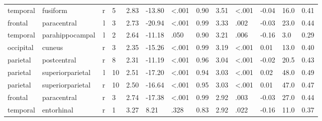 \documentclass{article}
\begin{document}
\begin{longtable}{llrR{1.5cm}R{1cm}R{1.3cm}R{1cm}R{1cm}R{1.3cm}R{1cm}R{1.8cm}R{1.3cm}R{1.8cm}}
  temporal &                  fusiform &    r &            5 &                  2.83 &           -13.80 &      \textless.001 &                               0.90 &                          3.51 &                   \textless.001 & -0.04 &   16.0 &      0.41 \\
   frontal &               paracentral &    l &            3 &                  2.73 &           -20.94 &      \textless.001 &                               0.99 &                          3.33 &                            .002 & -0.03 &   23.0 &      0.44 \\
  temporal &           parahippocampal &    l &            2 &                  2.64 &           -11.18 &               .050 &                               0.90 &                          3.21 &                            .006 & -0.16 &    3.0 &      0.29 \\
 occipital &                    cuneus &    r &            3 &                  2.35 &           -15.26 &      \textless.001 &                               0.99 &                          3.19 &                   \textless.001 &  0.01 &   13.0 &      0.40 \\
  parietal &               postcentral &    r &            8 &                  2.31 &           -11.19 &      \textless.001 &                               0.96 &                          3.04 &                   \textless.001 & -0.02 &   20.5 &      0.43 \\
  parietal &          superiorparietal &    l &           10 &                  2.51 &           -17.20 &      \textless.001 &                               0.94 &                          3.03 &                   \textless.001 &  0.02 &   48.0 &      0.49 \\
  parietal &          superiorparietal &    r &           10 &                  2.50 &           -16.64 &      \textless.001 &                               0.95 &                          3.03 &                   \textless.001 &  0.01 &   47.0 &      0.47 \\
   frontal &               paracentral &    r &            3 &                  2.74 &           -17.38 &      \textless.001 &                               0.99 &                          2.92 &                            .003 & -0.03 &   27.0 &      0.44 \\
  temporal &                entorhinal &    r &            1 &                  3.27 &             8.21 &               .328 &                               0.83 &                          2.92 &                            .022 & -0.16 &   11.0 &      0.37 \\

\end{longtable}
\end{document}
